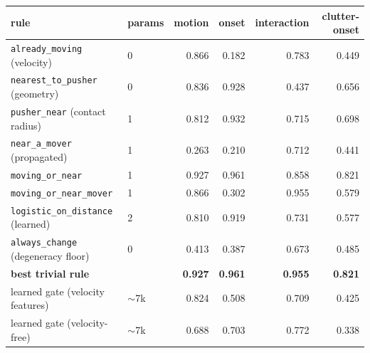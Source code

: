 \begin{tabular}{llrrrr}
\toprule
rule & params & motion & onset & interaction & clutter-onset \\
\midrule
\texttt{already\_moving} (velocity) & 0 & 0.866 & 0.182 & 0.783 & 0.449 \\
\texttt{nearest\_to\_pusher} (geometry) & 0 & 0.836 & 0.928 & 0.437 & 0.656 \\
\texttt{pusher\_near} (contact radius) & 1 & 0.812 & 0.932 & 0.715 & 0.698 \\
\texttt{near\_a\_mover} (propagated) & 1 & 0.263 & 0.210 & 0.712 & 0.441 \\
\texttt{moving\_or\_near} & 1 & 0.927 & 0.961 & 0.858 & 0.821 \\
\texttt{moving\_or\_near\_mover} & 1 & 0.866 & 0.302 & 0.955 & 0.579 \\
\texttt{logistic\_on\_distance} (learned) & 2 & 0.810 & 0.919 & 0.731 & 0.577 \\
\texttt{always\_change} (degeneracy floor) & 0 & 0.413 & 0.387 & 0.673 & 0.485 \\
\midrule
\textbf{best trivial rule} & & \textbf{0.927} & \textbf{0.961} & \textbf{0.955} & \textbf{0.821} \\
learned gate (velocity features) & $\sim$7k & 0.824 & 0.508 & 0.709 & 0.425 \\
learned gate (velocity-free) & $\sim$7k & 0.688 & 0.703 & 0.772 & 0.338 \\
\bottomrule
\end{tabular}
